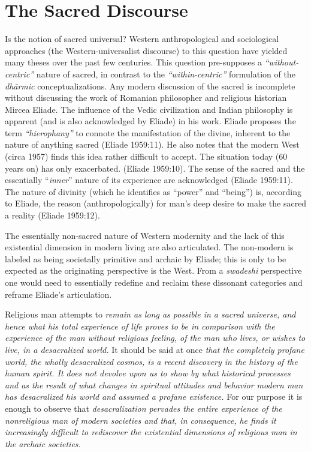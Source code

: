 \section*{The Sacred Discourse}

Is the notion of sacred universal? Western anthropological and sociological approaches (the Western-universalist discourse) to this question have yielded many theses over the past few centuries. This question pre-supposes a \textit{“without-centric”} nature of sacred, in contrast to the \textit{“within-centric”} formulation of the \textit{dhārmic} conceptualizations. Any modern discussion of the sacred is incomplete without discussing the work of Romanian philosopher and religious historian Mircea Eliade. The influence of the Vedic civilization and Indian philosophy is apparent (and is also acknowledged by Eliade) in his work. Eliade proposes the term \textit{“hierophany”} to connote the manifestation of the divine, inherent to the nature of anything sacred (Eliade 1959:11). He also notes that the modern West (circa 1957) finds this idea rather difficult to accept. The situation today (60 years on) has only exacerbated. (Eliade 1959:10). The sense of the sacred and the essentially “\textit{inner}” nature of its experience are acknowledged (Eliade 1959:11). The nature of divinity (which he identifies as “power” and “being”) is, according to Eliade, the reason (anthropologically) for man's deep desire to make the sacred a reality (Eliade 1959:12).

The essentially non-sacred nature of Western modernity and the lack of this existential dimension in modern living are also articulated. The non-modern is labeled as being societally primitive and archaic by Eliade; this is only to be expected as the originating perspective is the West. From a \textit{swadeshi} perspective one would need to essentially redefine and reclaim these dissonant categories and reframe Eliade's articulation.

\begin{myquote}
Religious man attempts to \textit{remain as long as possible in a sacred universe, and hence what his total experience of life proves to be in comparison with the experience of the man without religious feeling, of the man who lives, or wishes to live, in a desacralized world.} It should be said at once \textit{that the completely profane world, the wholly desacralized cosmos, is a recent discovery in the history of the human spirit. It does not devolve upon us to show by what historical processes and as the result of what changes in spiritual attitudes and behavior modern man has desacralized his world and assumed a profane existence.} For our purpose it is enough to observe that \textit{desacralization pervades the entire experience of the nonreligious man of modern societies and that, in consequence, he finds it increasingly difficult to rediscover the existential dimensions of religious man in the archaic societies.}
\end{myquote}

